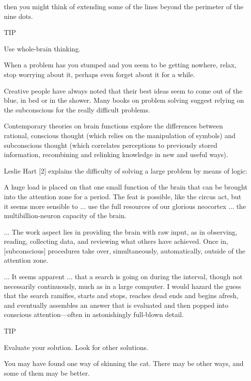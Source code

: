 then you might think of extending some of the lines beyond the perimeter
of the nine dots.

TIP

Use whole-brain thinking.

When a problem has you stumped and you seem to be getting nowhere,
relax, stop worrying about it, perhaps even forget about it for a while.

Creative people have always noted that their best ideas seem to
come out of the blue, in bed or in the shower. Many books on problem
solving suggest relying on the subconscious for the really difficult
problems.

Contemporary theories on brain functions explore the differences
between rational, conscious thought (which relies on the manipulation of
symbols) and subconscious thought (which correlates perceptions to
previously stored information, recombining and relinking knowledge in
new and useful ways).

Leslie Hart [2] explains the difficulty of solving a large problem by
means of logic:

A huge load is placed on that one small function of the brain that can be
brought into the attention zone for a period. The feat is possible, like the
circus act, but it seems more sensible to ... use the full resources of our
glorious neocortex ... the multibillion-neuron capacity of the brain.

... The work aspect lies in providing the brain with raw input, as in
observing, reading, collecting data, and reviewing what others have achieved.
Once in, [subconscious] procedures take over, simultaneously, automatically,
outside of the attention zone.

... It seems apparent ... that a search is going on during the interval,
though not necessarily continuously, much as in a large computer. I would
hazard the guess that the search ramifies, starts and stops, reaches dead
ends and begins afresh, and eventually assembles an answer that is
evaluated and then popped into conscious attention---often in astonishingly
full-blown detail.

TIP

Evaluate your solution. Look for other solutions.

You may have found one way of skinning the cat. There may be other
ways, and some of them may be better.

